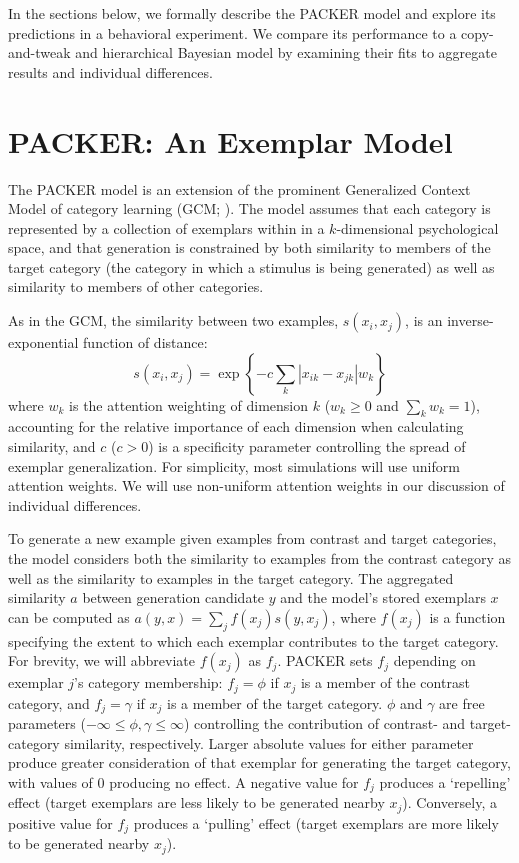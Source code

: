\documentclass[10pt,letterpaper]{article}
\begin{document}
In the sections below, we formally describe the PACKER model and explore its predictions in a behavioral experiment. We compare its performance to a copy-and-tweak and hierarchical Bayesian model by examining their fits to aggregate results and individual differences.

\section{PACKER: An Exemplar Model}

The PACKER model is an extension of the prominent Generalized Context Model of category learning (GCM; \citealp{nosofsky1984choice}). The model assumes that each category is represented by a collection of exemplars within in a $k$-dimensional psychological space, and that generation is constrained by both similarity to members of the target category (the category in which a stimulus is being generated) as well as similarity to members of other categories. 

As in the GCM, the similarity between two examples, $s\left(x_i, x_j\right)$, is an inverse-exponential function of distance:
\begin{equation}
  s\left(x_i,x_j\right) = \exp \left\{ -c \sum_{k}{ \left| x_{ik} - x_{jk} \right|}w_k \right\}
  \label{eq:similarity}
\end{equation}
where $w_k$ is the attention weighting of dimension $k$ ($w_k \geq 0$ and $\sum_k{w_k} = 1$), accounting for the relative importance of each dimension when calculating similarity, and $c$ ($c>0$) is a specificity parameter controlling the spread of exemplar generalization. For simplicity, most simulations will use uniform attention weights. We will use non-uniform attention weights in our discussion of individual differences.  


To generate a new example given examples from contrast and target categories, the model considers both the similarity to examples from the contrast category as well as the similarity to examples in the target category. The aggregated similarity $a$ between generation candidate $y$ and the model's stored exemplars $x$ can be computed as $a(y, x) = \sum_j{f(x_j) s(y, x_j)}$, where $f(x_j)$ is a function specifying the extent to which each exemplar contributes to the target category. For brevity, we will abbreviate $f(x_j)$ as $f_j$. PACKER sets $f_j$ depending on exemplar $j$'s category membership: $f_j = \phi$ if $x_j$ is a member of the contrast category, and $f_j = \gamma$ if $x_j$ is a member of the target category. $\phi$ and $\gamma$ are free parameters ($-\infty \leq \phi, \gamma \leq \infty$) controlling the contribution of contrast- and target-category similarity, respectively. Larger absolute values for either parameter produce greater consideration of that exemplar for generating the target category, with values of 0 producing no effect. A negative value for $f_j$ produces a `repelling' effect (target exemplars are less likely to be generated nearby $x_j$). Conversely, a positive value for $f_j$ produces a `pulling' effect (target exemplars are more likely to be generated nearby $x_j$). 
\end{document}
